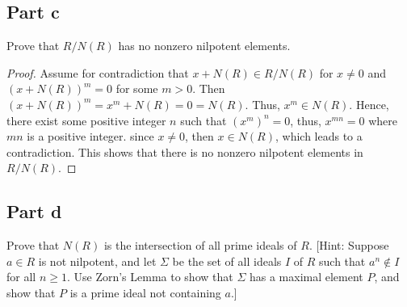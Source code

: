 \subsection{Part c}

\begin{question}
    Prove that $R / N(R)$ has no nonzero nilpotent elements.
\end{question}

\begin{answer}
    \begin{proof}
        Assume for contradiction that $x + N(R) \in R/N(R)$ for $x \neq 0$ and $(x + N(R))^m = 0$ for some $m > 0$. Then $(x + N(R))^m = x^m + N(R) = 0 = N(R)$. Thus, $x^m \in N(R)$. Hence, there exist some positive integer $n$ such that $(x^m)^n = 0$, thus, $x^{mn} = 0$ where $mn$ is a positive integer. since $x \neq 0$, then $x \in N(R)$, which leads to a contradiction. This shows that there is no nonzero nilpotent elements in $R/N(R)$.
    \end{proof}
\end{answer}

\subsection{Part d}

\begin{question}
    Prove that $N(R)$ is the intersection of all prime ideals of $R$. [Hint: Suppose $a \in R$ is not nilpotent, and let $\Sigma$ be the set of all ideals $I$ of $R$ such that $a^n \notin I$ for all $n \geq 1$. Use Zorn's Lemma to show that $\Sigma$ has a maximal element $P$, and show that $P$ is a prime ideal not containing $a$.]
\end{question}

